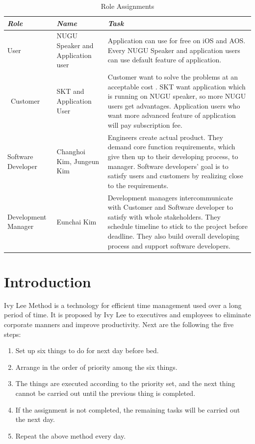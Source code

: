 \documentclass[conference]{IEEEtran}
\begin{document}
\begin{table}
\caption{Role Assignments}
\begin{center}
\begin{tabular}{ | m{5em} | m{2cm}| m{4cm} | }
\hline
\textbf{\textit{Role}}& \textbf{\textit{Name}}& \textbf{\textit{Task}} \\
\hline
User& NUGU Speaker and Application user & Application can use for free on iOS and AOS. Every NUGU Speaker and application users can use default feature of application. \\
\hline\
Customer& SKT and Application User & Customer want to solve the problems at an acceptable cost . SKT want application which is running on NUGU speaker, so more NUGU users get advantages. Application users who want more advanced feature of application will pay subscription fee. \\
\hline
Software Developer & Changhoi Kim, Jungeun Kim & Engineers create actual product. They demand core function requirements, which give then up to their developing process, to manager. Software developers’ goal is to satisfy users and customers by realizing close to the requirements. \\
\hline
Development Manager & Eunchai Kim & Development managers intercommunicate with Customer and Software developer to satisfy with whole stakeholders. They schedule timeline to stick to the project before deadline. They also build overall developing process and support software developers.\\
\hline
\end{tabular}
\label{tab1}
\end{center}
\end{table}

\section{Introduction}
Ivy Lee Method is a technology for efficient time management used over a long period of time. It is proposed by Ivy Lee to executives and employees to eliminate corporate manners and improve productivity. Next are the following the five steps:\\

\begin{enumerate}
\item Set up six things to do for next day before bed. \\
\item Arrange in the order of priority among the six things. \\
\item The things are executed according to the priority set, and the next thing cannot be carried out until the previous thing is completed. \\
\item If the assignment is not completed, the remaining tasks will be carried out the next day. \\
\item Repeat the above method every day. \\
\end{enumerate}
 
\end{document}
